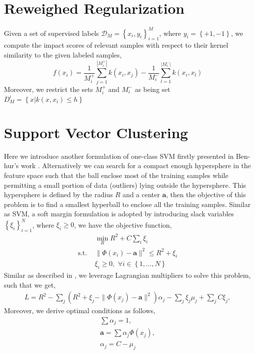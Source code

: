 \documentclass{llncs}
\newcommand{\vct}[1]{\ensuremath{\boldsymbol{#1}}} %
\newcommand{\set}[1]{\ensuremath{\mathcal{#1}}}
\begin{document}
\section{Reweighed Regularization}
Given a set of supervised labels $\set D_M = \left\{x_i, y_i\right\}_{i=1}^M$, where $y_i=\left\{+1, -1\right\}$, we compute the impact scores of relevant samples with respect to their kernel similarity to the given labeled samples, 
\[
f(x_i) = \frac{1}{M_i^+}\sum_{j=1}^{|M_i^+|}k(x_i, x_j) - \frac{1}{M_i^-}\sum_{l=1}^{|M_i^-|}k(x_i, x_l)
\]
Moreover, we restrict the sets $M_i^+$ and $M_i^-$ as being set $D_M^i = \left\{x | k(x, x_i) \leq h \right\}$

\section{Support Vector Clustering}
Here we introduce another formulation of one-class SVM firstly presented in Ben-hur's work \cite{benhur_svc}. Alternatively we can search for a compact enough hypersphere in the feature space such that the ball enclose most of the training samples while permitting a small portion of data (outliers) lying outside the hypersphere. This hypersphere is defined by the radius $R$ and a center $\vct a$, then the objective of this problem is to find a smallest hyperball to enclose all the training samples.
Similar as SVM, a soft margin formulation is adopted by introducing slack variables $\left\{\xi_i\right\}_{i=1}^N$, where $\xi_i\geq 0$, we have the objective function, 
\begin{align}
& \min_{R} R^2  + C\sum_{i}\xi_i\\ \nonumber
\text{s.t. } &
\|\Phi(x_i) - \vct a\|^2 \leq R^2+\xi_i  \\ \nonumber
& \xi_i \geq 0, \,\, \forall i \in \left\{1, \ldots, N \right\}
\end{align}
Similar as described in \cite{benhur_svc}, we leverage Lagrangian multipliers to solve this problem, such that we get,
\begin{align}
	L=R^2-\sum_j\left(R^2+\xi_j-\|\Phi(x_j)-\mathbf{a}\|^2\right)\alpha_j-\sum_j\xi_j\mu_j+\sum_j C\xi_j,
\end{align}
Moreover, we derive optimal conditions as follows,
\begin{align}
\sum\alpha_j=1, \label{eq:opt:1} \\ 
\mathbf{a}=\sum\alpha_j\Phi(x_j), \label{eq:opt:2} \\ 
\alpha_j=C-\mu_j \label{eq:opt:3}
\end{align}
\end{document}
